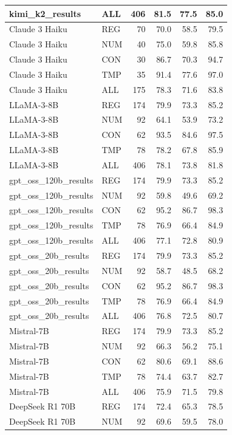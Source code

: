 \begin{table}[h]
\begin{tabular}{llrrrr}
kimi_k2_results & ALL & 406 & 81.5 & 77.5 & 85.0 \\
\midrule
Claude 3 Haiku & REG & 70 & 70.0 & 58.5 & 79.5 \\
Claude 3 Haiku & NUM & 40 & 75.0 & 59.8 & 85.8 \\
Claude 3 Haiku & CON & 30 & 86.7 & 70.3 & 94.7 \\
Claude 3 Haiku & TMP & 35 & 91.4 & 77.6 & 97.0 \\
Claude 3 Haiku & ALL & 175 & 78.3 & 71.6 & 83.8 \\
\midrule
LLaMA-3-8B & REG & 174 & 79.9 & 73.3 & 85.2 \\
LLaMA-3-8B & NUM & 92 & 64.1 & 53.9 & 73.2 \\
LLaMA-3-8B & CON & 62 & 93.5 & 84.6 & 97.5 \\
LLaMA-3-8B & TMP & 78 & 78.2 & 67.8 & 85.9 \\
LLaMA-3-8B & ALL & 406 & 78.1 & 73.8 & 81.8 \\
\midrule
gpt_oss_120b_results & REG & 174 & 79.9 & 73.3 & 85.2 \\
gpt_oss_120b_results & NUM & 92 & 59.8 & 49.6 & 69.2 \\
gpt_oss_120b_results & CON & 62 & 95.2 & 86.7 & 98.3 \\
gpt_oss_120b_results & TMP & 78 & 76.9 & 66.4 & 84.9 \\
gpt_oss_120b_results & ALL & 406 & 77.1 & 72.8 & 80.9 \\
\midrule
gpt_oss_20b_results & REG & 174 & 79.9 & 73.3 & 85.2 \\
gpt_oss_20b_results & NUM & 92 & 58.7 & 48.5 & 68.2 \\
gpt_oss_20b_results & CON & 62 & 95.2 & 86.7 & 98.3 \\
gpt_oss_20b_results & TMP & 78 & 76.9 & 66.4 & 84.9 \\
gpt_oss_20b_results & ALL & 406 & 76.8 & 72.5 & 80.7 \\
\midrule
Mistral-7B & REG & 174 & 79.9 & 73.3 & 85.2 \\
Mistral-7B & NUM & 92 & 66.3 & 56.2 & 75.1 \\
Mistral-7B & CON & 62 & 80.6 & 69.1 & 88.6 \\
Mistral-7B & TMP & 78 & 74.4 & 63.7 & 82.7 \\
Mistral-7B & ALL & 406 & 75.9 & 71.5 & 79.8 \\
\midrule
DeepSeek R1 70B & REG & 174 & 72.4 & 65.3 & 78.5 \\
DeepSeek R1 70B & NUM & 92 & 69.6 & 59.5 & 78.0 \\

\end{tabular}
\end{table}
